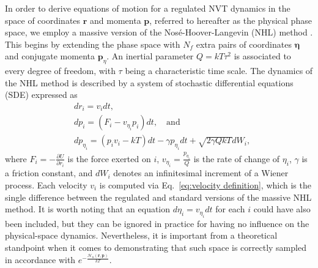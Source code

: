 \documentclass[
aip,
jcp,
reprint,
]{revtex4-1}
\newcommand{\vt}[1]{\boldsymbol{\mathbf{#1}}}          %
\newcommand{\diff}[2]{\frac{\partial #2}{\partial #1}} %
\newcommand{\nn}{n}
\begin{document}
In order to derive equations of motion for a regulated NVT dynamics in the space of coordinates $\vt r$ and momenta $\vt p$, referred to hereafter as the physical phase space, we employ a massive version of the Nos\'{e}-Hoover-Langevin (NHL) method \cite{Samoletov_2007, Leimkuhler_2009}.
This begins by extending the phase space with $N_f$ extra pairs of coordinates $\vt \eta$ and conjugate momenta $\vt p_\eta$.
An inertial parameter $Q = kT \tau^2$ is associated to every degree of freedom, with $\tau$ being a characteristic time scale.
The dynamics of the NHL method is described by a system of stochastic differential equations (SDE) expressed as
\begin{subequations}
	\label{eq:regulated massive NHL equations}
	\begin{align}
	&dr_i = v_i dt, \\
	&dp_i = (F_i - v_{\eta_i} p_i) dt, \quad \mathrm{and} \\
	&dp_{\eta_i} = (p_i v_i - kT) dt - \gamma p_{\eta_i} dt + \sqrt{2 \gamma Q kT} dW_i,
	\end{align}
\end{subequations}
where $F_i = -\diff{r_i}{U}$ is the force exerted on $i$,
$v_{\eta_i} = \frac{p_{\eta_i}}{Q}$ is the rate of change of $\eta_i$,
$\gamma$ is a friction constant, and
$dW_i$ denotes an infinitesimal increment of a Wiener process.
Each velocity $v_i$ is computed via Eq.~\eqref{eq:velocity definition}, which is the single difference between the regulated and standard versions of the massive NHL method.
It is worth noting that an equation $d\eta_i = v_{\eta_i} dt$ for each $i$ could have also been included, but they can be ignored in practice for having no influence on the physical-space dynamics.
Nevertheless, it is important from a theoretical standpoint when it comes to demonstrating that such space is correctly sampled in accordance with $e^{-\frac{\mathcal{H}_\nn(\vt r, \vt p)}{kT}}$.
\end{document}
